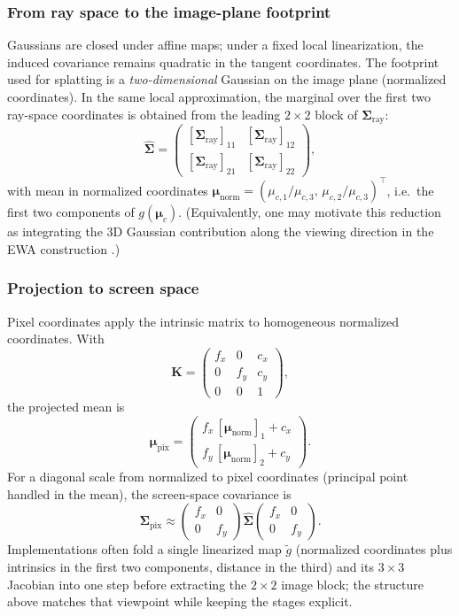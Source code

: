 \subsubsection{From ray space to the image-plane footprint}

Gaussians are closed under affine maps; under a fixed local linearization, the induced covariance remains quadratic in the tangent coordinates. The footprint used for splatting is a \emph{two-dimensional} Gaussian on the image plane (normalized coordinates). In the same local approximation, the marginal over the first two ray-space coordinates is obtained from the leading $2\times 2$ block of $\boldsymbol{\Sigma}_{\mathrm{ray}}$:
\[
\hat{\boldsymbol{\Sigma}} =
\begin{pmatrix}
[\boldsymbol{\Sigma}_{\mathrm{ray}}]_{11} & [\boldsymbol{\Sigma}_{\mathrm{ray}}]_{12} \\
[\boldsymbol{\Sigma}_{\mathrm{ray}}]_{21} & [\boldsymbol{\Sigma}_{\mathrm{ray}}]_{22}
\end{pmatrix},
\]
with mean in normalized coordinates $\boldsymbol{\mu}_{\mathrm{norm}}=(\mu_{c,1}/\mu_{c,3},\,\mu_{c,2}/\mu_{c,3})^\top$, i.e.\ the first two components of $g(\boldsymbol{\mu}_c)$. (Equivalently, one may motivate this reduction as integrating the 3D Gaussian contribution along the viewing direction in the EWA construction \cite{zwicker2002ewa}.)

\subsubsection{Projection to screen space}

Pixel coordinates apply the intrinsic matrix to homogeneous normalized coordinates. With
\[
\mathbf{K}=
\begin{pmatrix}
f_x & 0 & c_x \\
0 & f_y & c_y \\
0 & 0 & 1
\end{pmatrix},
\]
the projected mean is
\[
\boldsymbol{\mu}_{\mathrm{pix}}=
\begin{pmatrix}
f_x\,[\boldsymbol{\mu}_{\mathrm{norm}}]_1 + c_x \\
f_y\,[\boldsymbol{\mu}_{\mathrm{norm}}]_2 + c_y
\end{pmatrix}.
\]
For a diagonal scale from normalized to pixel coordinates (principal point handled in the mean), the screen-space covariance is
\[
\boldsymbol{\Sigma}_{\mathrm{pix}} \approx
\begin{pmatrix}
f_x & 0 \\
0 & f_y
\end{pmatrix}
\hat{\boldsymbol{\Sigma}}
\begin{pmatrix}
f_x & 0 \\
0 & f_y
\end{pmatrix}.
\]
Implementations often fold a single linearized map $\tilde{g}$ (normalized coordinates plus intrinsics in the first two components, distance in the third) and its $3\times 3$ Jacobian into one step before extracting the $2\times 2$ image block; the structure above matches that viewpoint while keeping the stages explicit.

